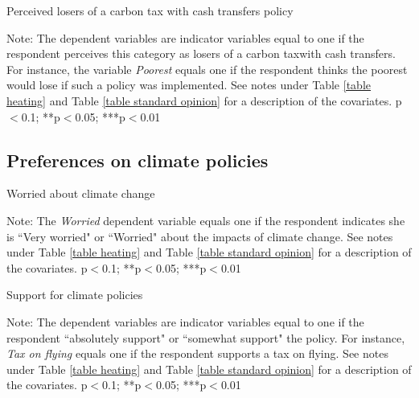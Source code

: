 \documentclass{article}
\begin{document}
\begin{table}[h!]
	\caption{Perceived losers of a carbon tax with cash transfers policy}
	\begin{center}
		\scalebox{0.7}{}
	\end{center}
	{\footnotesize Note: The dependent variables are indicator variables equal to one if the respondent perceives this category as losers of a carbon taxwith cash transfers. For instance, the variable \textit{Poorest} equals one if the respondent thinks the poorest would lose if such a policy was implemented. See notes under Table \ref{table heating} and Table \ref{table standard opinion} for a description of the covariates.
	\newline *p$<$0.1; **p$<$0.05; ***p$<$0.01}
\end{table}	

\clearpage
\subsection{Preferences on climate policies}

\begin{table}[h!]
	\caption{Worried about climate change}
	\begin{center}
		\scalebox{0.7}{}
	\end{center}
	{\footnotesize Note: The \textit{Worried} dependent variable equals one if the respondent indicates she is ``Very worried" or ``Worried" about the impacts of climate change. See notes under Table \ref{table heating} and Table \ref{table standard opinion} for a description of the covariates.
	\newline *p$<$0.1; **p$<$0.05; ***p$<$0.01}
\end{table}	

\begin{table}[h!]
	\caption{Support for climate policies}
	\begin{center}
		\scalebox{0.7}{}
	\end{center}
	{\footnotesize Note: The dependent variables are indicator variables equal to one if the respondent ``absolutely support" or ``somewhat support" the policy. For instance, \textit{Tax on flying} equals one if the respondent supports a tax on flying. See notes under Table \ref{table heating} and Table \ref{table standard opinion} for a description of the covariates.
	\newline *p$<$0.1; **p$<$0.05; ***p$<$0.01}
\end{table}	
\end{document}
